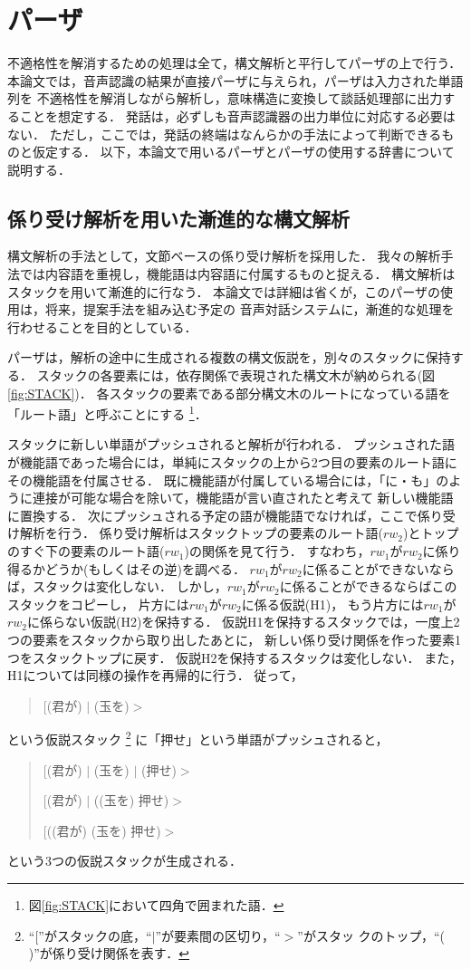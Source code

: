 \section{パーザ}\label{sec:PARSER}
不適格性を解消するための処理は全て，構文解析と平行してパーザの上で行う．
本論文では，音声認識の結果が直接パーザに与えられ，パーザは入力された単語列を
不適格性を解消しながら解析し，意味構造に変換して談話処理部に出力することを想定する．
発話は，必ずしも音声認識器の出力単位に対応する必要はない．
ただし，ここでは，発話の終端はなんらかの手法によって判断できるものと仮定する．
以下，本論文で用いるパーザとパーザの使用する辞書について説明する．

\subsection{係り受け解析を用いた漸進的な構文解析}\label{subsec:PARSER}
構文解析の手法として，文節ベースの係り受け解析を採用した．
我々の解析手法では内容語を重視し，機能語は内容語に付属するものと捉える．
構文解析はスタックを用いて漸進的に行なう．
本論文では詳細は省くが，このパーザの使用は，将来，提案手法を組み込む予定の
音声対話システムに，漸進的な処理を行わせることを目的としている．

パーザは，解析の途中に生成される複数の構文仮説を，別々のスタックに保持する．
スタックの各要素には，依存関係で表現された構文木が納められる(図\ref{fig:STACK})．
各スタックの要素である部分構文木のルートになっている語を「ルート語」と呼ぶことにする
\footnote{図\ref{fig:STACK}において四角で囲まれた語．}．

スタックに新しい単語がプッシュされると解析が行われる．
プッシュされた語が機能語であった場合には，単純にスタックの上から2つ目の要素のルート語にその機能語を付属させる．
既に機能語が付属している場合には，「に・も」のように連接が可能な場合を除いて，機能語が言い直されたと考えて
新しい機能語に置換する．
次にプッシュされる予定の語が機能語でなければ，ここで係り受け解析を行う．
係り受け解析はスタックトップの要素のルート語($rw_2$)とトップのすぐ下の要素のルート語($rw_1$)の関係を見て行う．
すなわち，$rw_1$が$rw_2$に係り得るかどうか(もしくはその逆)を調べる．
$rw_1$が$rw_2$に係ることができないならば，スタックは変化しない．
しかし，$rw_1$が$rw_2$に係ることができるならばこのスタックをコピーし，
片方には$rw_1$が$rw_2$に係る仮説(H1)，
もう片方には$rw_1$が$rw_2$に係らない仮説(H2)を保持する．
仮説H1を保持するスタックでは，一度上2つの要素をスタックから取り出したあとに，
新しい係り受け関係を作った要素1つをスタックトップに戻す．
仮説H2を保持するスタックは変化しない．
また，H1については同様の操作を再帰的に行う．
従って，
\begin{quote}
[(君が) $|$ (玉を)$>$
\end{quote}
という仮説スタック
\footnote{``[''がスタックの底，``$|$''が要素間の区切り，``$>$''がスタッ
  クのトップ，``( )''が係り受け関係を表す．}
に「押せ」という単語がプッシュされると，
\begin{quote}
[(君が) $|$ (玉を) $|$ (押せ)$>$

[(君が) $|$ ((玉を) 押せ)$>$

[((君が) (玉を) 押せ)$>$
\end{quote}
という3つの仮説スタックが生成される．

